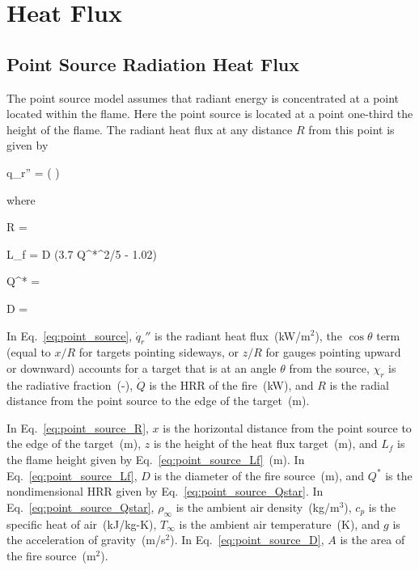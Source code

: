 \chapter{Heat Flux}
\label{Heat_Flux_Chapter}

\section{Point Source Radiation Heat Flux}

The point source model assumes that radiant energy is concentrated at a point located within the flame. Here the point source is located at a point one-third the height of the flame. The radiant heat flux at any distance $R$ from this point is given by

\be
\dot q_r'' = \cos\theta \left(  \right)
\label{eq:point_source}
\ee

\noindent where

\be
R = 
\label{eq:point_source_R}
\ee

\be
L_f = D (3.7 Q^{*^{2/5}} - 1.02)
\label{eq:point_source_Lf}
\ee

\be
Q^* = 
\label{eq:point_source_Qstar}
\ee

\be
D = 
\label{eq:point_source_D}
\ee

In Eq.~\ref{eq:point_source}, $\dot q_r''$ is the radiant heat flux~(kW/m$^2$), the $\cos\theta$ term (equal to $x/R$ for targets pointing sideways, or $z/R$ for gauges pointing upward or downward) accounts for a target that is at an angle $\theta$ from the source, $\chi_r$ is the radiative fraction~(-), $\dot Q$ is the HRR of the fire~(kW), and $R$ is the radial distance from the point source to the edge of the target~(m).

In Eq.~\ref{eq:point_source_R}, $x$ is the horizontal distance from the point source to the edge of the target~(m), $z$ is the height of the heat flux target~(m), and $L_f$ is the flame height given by Eq.~\ref{eq:point_source_Lf}~(m).
In Eq.~\ref{eq:point_source_Lf}, $D$ is the diameter of the fire source~(m), and $Q^*$ is the nondimensional HRR given by Eq.~\ref{eq:point_source_Qstar}. In Eq.~\ref{eq:point_source_Qstar}, $\rho_\infty$ is the ambient air density~(kg/m$^3$), $c_p$ is the specific heat of air~(kJ/kg-K), $T_\infty$ is the ambient air temperature~(K), and $g$ is the acceleration of gravity~(m/s$^2$). In Eq.~\ref{eq:point_source_D}, $A$ is the area of the fire source~(m$^2$).


